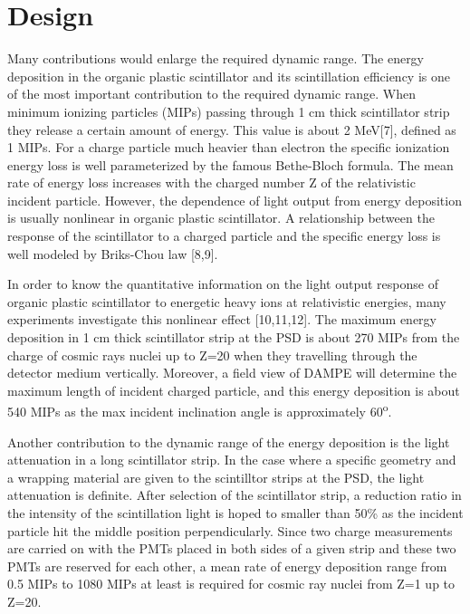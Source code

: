 \documentclass[5p, times]{elsarticle}
\begin{document}
\section{Design}
\label{sec:design}

Many contributions would enlarge the required dynamic range. The energy deposition in the organic plastic scintillator
and its scintillation efficiency is one of the most important contribution to the required dynamic range. When minimum
ionizing particles (MIPs) passing through 1 cm thick scintillator strip they release a certain amount of energy. This
value is about 2 MeV[7], defined as 1 MIPs. For a charge particle much heavier than electron the specific ionization
energy loss is well parameterized by the famous Bethe-Bloch formula. The mean rate of energy loss increases with the
charged number Z of the relativistic incident particle. However, the dependence of light output from energy deposition
is usually nonlinear in organic plastic scintillator. A relationship between the response of the scintillator to a
charged particle and the specific energy loss is well modeled by Briks-Chou law [8,9]. 

In order to know the quantitative information on the light output response of organic plastic scintillator to energetic
heavy ions at relativistic energies, many experiments investigate this nonlinear effect [10,11,12]. The maximum energy
deposition in 1 cm thick scintillator strip at the PSD is about 270 MIPs from the charge of cosmic rays nuclei up to
Z=20 when they travelling through the detector medium vertically. Moreover, a field view of DAMPE will determine the
maximum length of incident charged particle, and this energy deposition is about 540 MIPs as the max incident
inclination angle is approximately 60\textsuperscript{o}.

Another contribution to the dynamic range of the energy deposition is the light attenuation in a long scintillator
strip. In the case where a specific geometry and a wrapping material are given to the scintilltor strips at the PSD,
the light attenuation is definite. After selection of the scintillator strip, a reduction ratio in the intensity of the
scintillation light is hoped to smaller than 50\% as the incident particle hit the middle position perpendicularly.
Since two charge measurements are carried on with the PMTs placed in both sides of a given strip and these two PMTs are
reserved for each other, a mean rate of energy deposition range from 0.5 MIPs to 1080 MIPs at least is required for
cosmic ray nuclei from Z=1 up to Z=20.
\end{document}
